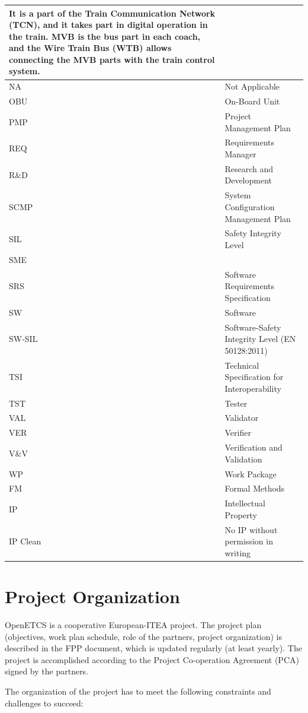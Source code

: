 \documentclass{template/openetcs_article}
\begin{document}
\begin{supertabular}{|m{3cm}m{11cm}|}
It is a part of the Train Communication Network (TCN), and it takes part in digital operation in the train. MVB is the bus part in each coach, and the Wire Train Bus (WTB) allows connecting the MVB parts with the train control system.\\\hline
NA &
Not Applicable\\\hline
OBU &
On-Board Unit\\\hline
PMP &
Project Management Plan\\\hline
REQ &
Requirements Manager\\\hline
R\&D &
Research and Development\\\hline
SCMP &
System Configuration Management Plan\\\hline
SIL &
Safety Integrity Level\\\hline
SME &
~
\\\hline
SRS &
Software Requirements Specification\\\hline
SW &
Software\\\hline
SW-SIL &
Software-Safety Integrity Level (EN 50128:2011)\\\hline
TSI &
Technical Specification for Interoperability\\\hline
TST &
Tester\\\hline
VAL &
Validator\\\hline
VER &
Verifier\\\hline
V\&V &
Verification and Validation\\\hline
WP &
Work Package\\\hline
FM &
Formal Methods\\\hline
IP &
Intellectual Property\\\hline
IP Clean &
No IP without permission in writing \\\hline
\end{supertabular}

\newpage
\section{Project Organization}

OpenETCS is a cooperative European-ITEA project. The project plan (objectives, work plan schedule, role of the partners, project organization) is described in the \citep{fpp} FPP document, which is updated regularly (at least yearly). The project is accomplished according to the Project Co-operation Agreement (PCA) \citep{PCA} signed by the partners.

The organization of the project has to meet the following constraints and challenges to succeed:
\end{document}
